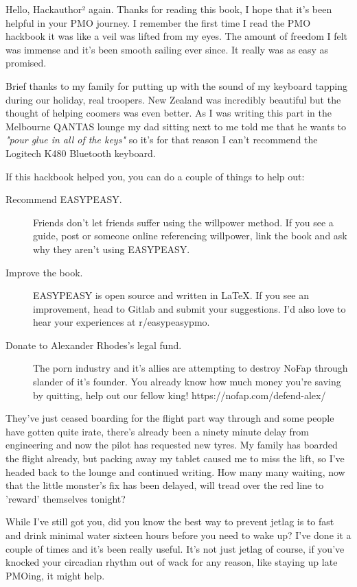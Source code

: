 \documentclass[easypeasy.tex]{subfiles}
\begin{document}
Hello, Hackauthor² again. Thanks for reading this book, I hope that it's been helpful in your PMO journey. I remember the first time I read the PMO hackbook it was like a veil was lifted from my eyes. The amount of freedom I felt was immense and it's been smooth sailing ever since. It really was as easy as promised.

Brief thanks to my family for putting up with the sound of my keyboard tapping during our holiday, real troopers. New Zealand was incredibly beautiful but the thought of helping coomers was even better. As I was writing this part in the Melbourne QANTAS lounge my dad sitting next to me told me that he wants to \textit{"pour glue in all of the keys"} so it's for that reason I can't recommend the Logitech K480 Bluetooth keyboard.

If this hackbook helped you, you can do a couple of things to help out:
  \begin{description}
  \item [Recommend EASYPEASY.] Friends don't let friends suffer using the willpower method. If you see a guide, post or someone online referencing willpower, link the book and ask why they aren't using EASYPEASY.

  \item [Improve the book.] EASYPEASY is open source and written in LaTeX. If you see an improvement, head to Gitlab and submit your suggestions. I'd also love to hear your experiences at r/easypeasypmo.

  \item [Donate to Alexander Rhodes's legal fund.] The porn industry and it's allies are attempting to destroy NoFap through slander of it's founder. You already know how much money you're saving by quitting, help out our fellow king! https://nofap.com/defend-alex/
  \end{description}

They've just ceased boarding for the flight part way through and some people have gotten quite irate, there's already been a ninety minute delay from engineering and now the pilot has requested new tyres. My family has boarded the flight already, but packing away my tablet caused me to miss the lift, so I've headed back to the lounge and continued writing. How many many waiting, now that the little monster's fix has been delayed, will tread over the red line to 'reward' themselves tonight?

While I've still got you, did you know the best way to prevent jetlag is to fast and drink minimal water sixteen hours before you need to wake up? I've done it a couple of times and it's been really useful. It's not just jetlag of course, if you've knocked your circadian rhythm out of wack for any reason, like staying up late PMOing, it might help.
\end{document}
